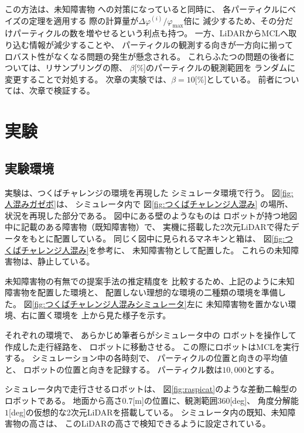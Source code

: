 \documentclass{jarticle}
\begin{document}
この方法は、未知障害物
への対策になっていると同時に、
各パーティクルにベイズの定理を適用する
際の計算量が$\Delta\varphi^{(i)}/\varphi_\text{max}$倍に
減少するため、その分だけパーティクルの数を増やせるという利点も持つ。
一方、LiDARからMCLへ取り込む情報が減少することや、
パーティクルの観測する向きが一方向に揃って
ロバスト性がなくなる問題の発生が懸念される。
これらふたつの問題の後者については、リサンプリングの際、
$\beta$[\%]のパーティクルの観測範囲を
ランダムに変更することで対処する。
次章の実験では、$\beta=10$[\%]としている。
前者については、次章で検証する。

\section{実験}%

\subsection{実験環境}

実験は、つくばチャレンジの環境を再現した
シミュレータ環境で行う。
図\ref{fig:人混みガゼボ}は、
シミュレータ内で
図\ref{fig:つくばチャレンジ人混み}
の場所、状況を再現した部分である。
図中にある壁のようなものは
ロボットが持つ地図中に記載のある障害物（既知障害物）で、
実機に搭載した2次元LiDARで得たデータをもとに配置している。
同じく図中に見られるマネキンと箱は、
図\ref{fig:つくばチャレンジ人混み}を参考に、
未知障害物として配置した。
これらの未知障害物は、静止している。

未知障害物の有無での提案手法の推定精度を
比較するため、上記のように未知障害物を配置した環境と、
配置しない理想的な環境の二種類の環境を準備した。
図\ref{fig:つくばチャレンジ人混みシミュレータ}左に
未知障害物を置かない環境、右に置く環境を
上から見た様子を示す。




それぞれの環境で、
あらかじめ筆者らがシミュレータ中の
ロボットを操作して作成した走行経路を、
ロボットに移動させる。
この際にロボットはMCLを実行する。
シミュレーション中の各時刻で、
パーティクルの位置と向きの平均値と、
ロボットの位置と向きを記録する。
パーティクル数は$10,000$とする。

シミュレータ内で走行させるロボットは、
図\ref{fig:raspicat}のような差動二輪型のロボットである。
地面から高さ$0.7$[m]の位置に、観測範囲$360$[deg]、
角度分解能$1$[deg]の仮想的な2次元LiDARを搭載している。
シミュレータ内の既知、未知障害物の高さは、
このLiDARの高さで検知できるように設定されている。
\end{document}
